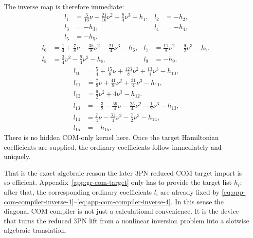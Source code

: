 \documentclass[11pt]{article}
\begin{document}
The inverse map is therefore immediate:
\begin{equation}
\begin{aligned}
 l_1 &= \frac{3}{16}\nu-\frac{21}{16}\nu^2+\frac94\nu^3-h_1,
 & l_2 &= -h_2,
\\
 l_3 &= -h_3,
 & l_4 &= -h_4,
\\
 l_5 &= -h_5.
\end{aligned}
\label{eq:app-com-compiler-inverse-1}
\end{equation}
\begin{equation}
\begin{aligned}
 l_6 &= \frac14+\frac78\nu-\frac{35}{8}\nu^2-\frac{21}{4}\nu^3-h_6,
 & l_7 &= \frac{11}{8}\nu^2-\frac92\nu^3-h_7,
\\
 l_8 &= \frac34\nu^2-\frac94\nu^3-h_8,
 & l_9 &= -h_9.
\end{aligned}
\label{eq:app-com-compiler-inverse-2}
\end{equation}
\begin{equation}
\begin{aligned}
 l_{10} &= \frac54+\frac{15}{8}\nu+\frac{123}{8}\nu^2+\frac{13}{4}\nu^3-h_{10},
\\
 l_{11} &= \frac78\nu+\frac{41}{8}\nu^2+\frac{31}{4}\nu^3-h_{11},
\\
 l_{12} &= \frac92\nu^2+4\nu^3-h_{12}.
\end{aligned}
\label{eq:app-com-compiler-inverse-3}
\end{equation}
\begin{equation}
\begin{aligned}
 l_{13} &= -\frac32-\frac{59}{4}\nu-\frac{25}{4}\nu^2-\frac12\nu^3-h_{13},
\\
 l_{14} &= \frac74\nu-\frac{31}{4}\nu^2-\frac72\nu^3-h_{14},
\\
 l_{15} &= -h_{15}.
\end{aligned}
\label{eq:app-com-compiler-inverse-4}
\end{equation}
There is no hidden COM-only kernel here.  Once the target Hamiltonian
coefficients are supplied, the ordinary coefficients follow immediately and
uniquely.

That is the exact algebraic reason the later $3$PN reduced COM target import is
so efficient.  Appendix~\ref{app:gr-com-target} only has to provide the target
list \(h_i\); after that, the corresponding ordinary coefficients \(l_i\) are
already fixed by \eqref{eq:app-com-compiler-inverse-1}--\eqref{eq:app-com-compiler-inverse-4}.
In this sense the diagonal COM compiler is not just a calculational convenience.
It is the device that turns the reduced $3$PN lift from a nonlinear inversion
problem into a slotwise algebraic translation.
\end{document}
